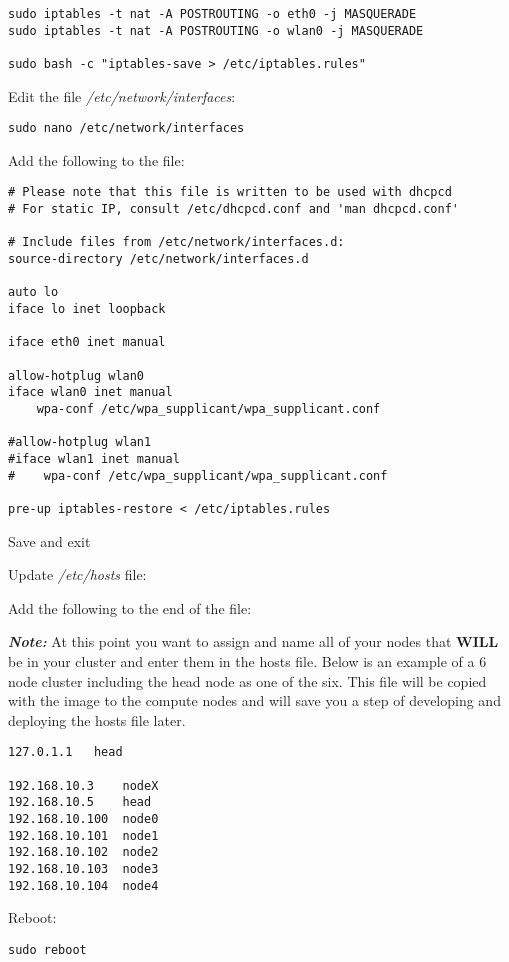 \documentclass[]{article}
\begin{document}
\begin{verbatim}
sudo iptables -t nat -A POSTROUTING -o eth0 -j MASQUERADE
sudo iptables -t nat -A POSTROUTING -o wlan0 -j MASQUERADE

sudo bash -c "iptables-save > /etc/iptables.rules"
\end{verbatim}

Edit the file \emph{/etc/network/interfaces}:

\texttt{sudo\ nano\ /etc/network/interfaces}

Add the following to the file:

\begin{verbatim}
# Please note that this file is written to be used with dhcpcd
# For static IP, consult /etc/dhcpcd.conf and 'man dhcpcd.conf'

# Include files from /etc/network/interfaces.d:
source-directory /etc/network/interfaces.d

auto lo
iface lo inet loopback

iface eth0 inet manual

allow-hotplug wlan0
iface wlan0 inet manual
    wpa-conf /etc/wpa_supplicant/wpa_supplicant.conf

#allow-hotplug wlan1
#iface wlan1 inet manual
#    wpa-conf /etc/wpa_supplicant/wpa_supplicant.conf

pre-up iptables-restore < /etc/iptables.rules
\end{verbatim}

Save and exit

Update \emph{/etc/hosts} file:

Add the following to the end of the file:

\emph{\textbf{Note:}} At this point you want to assign and name all of
your nodes that \textbf{WILL} be in your cluster and enter them in the
hosts file. Below is an example of a 6 node cluster including the head
node as one of the six. This file will be copied with the image to the
compute nodes and will save you a step of developing and deploying the
hosts file later.

\begin{verbatim}
127.0.1.1   head

192.168.10.3    nodeX
192.168.10.5    head
192.168.10.100  node0
192.168.10.101  node1
192.168.10.102  node2
192.168.10.103  node3
192.168.10.104  node4
\end{verbatim}

Reboot:

\texttt{sudo\ reboot}
\end{document}
